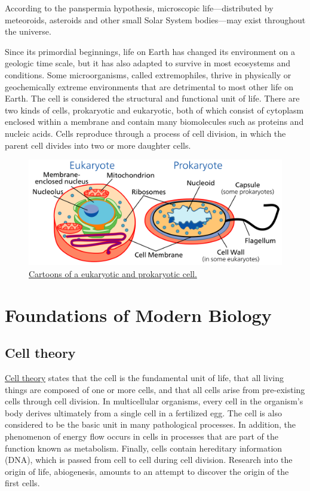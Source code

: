 According to the panspermia hypothesis, microscopic life---distributed by meteoroids, asteroids and other small Solar System bodies---may exist throughout the universe.

Since its primordial beginnings, life on Earth has changed its environment on a geologic time scale, but it has also adapted to survive in most ecosystems and conditions. Some microorganisms, called extremophiles, thrive in physically or geochemically extreme environments that are detrimental to most other life on Earth. The cell is considered the structural and functional unit of life. There are two kinds of cells, prokaryotic and eukaryotic, both of which consist of cytoplasm enclosed within a membrane and contain many biomolecules such as proteins and nucleic acids. Cells reproduce through a process of cell division, in which the parent cell divides into two or more daughter cells.



\begin{figure}

{\centering \includegraphics[width=0.7\linewidth]{./figures/life/Celltypes} 

}

\caption{\href{https://commons.wikimedia.org/wiki/File:Celltypes.svg}{Cartoons of a eukaryotic and prokaryotic cell.}}\label{fig:celltypecartoon}
\end{figure}

\hypertarget{foundations-of-modern-biology}{%
\section{Foundations of Modern Biology}\label{foundations-of-modern-biology}}

\hypertarget{cell-theory}{%
\subsection{Cell theory}\label{cell-theory}}

\href{https://en.wikipedia.org/wiki/Cell_theory}{Cell theory} states that the cell is the fundamental unit of life, that all living things are composed of one or more cells, and that all cells arise from pre-existing cells through cell division. In multicellular organisms, every cell in the organism's body derives ultimately from a single cell in a fertilized egg. The cell is also considered to be the basic unit in many pathological processes. In addition, the phenomenon of energy flow occurs in cells in processes that are part of the function known as metabolism. Finally, cells contain hereditary information (DNA), which is passed from cell to cell during cell division. Research into the origin of life, abiogenesis, amounts to an attempt to discover the origin of the first cells.

